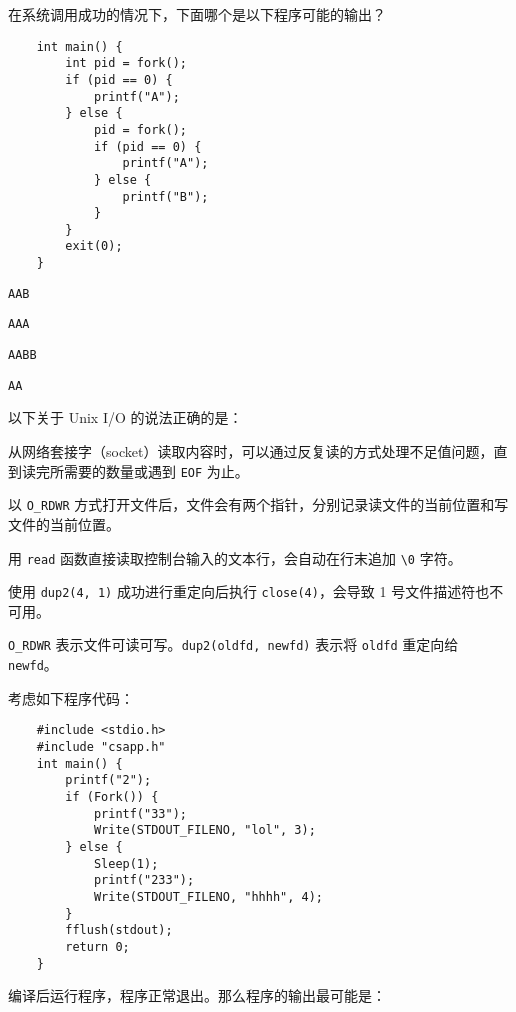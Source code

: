 \begin{problems}
\begin{choices}
        \end{choices}
         在系统调用成功的情况下，下面哪个是以下程序可能的输出？
        \begin{verbatim}
    int main() {
        int pid = fork();
        if (pid == 0) {
            printf("A");
        } else {
            pid = fork();
            if (pid == 0) {
                printf("A");
            } else {
                printf("B");
            }
        }
        exit(0);
    }
        \end{verbatim}
        \begin{choices}
            \item \verb|AAB|
            \item \verb|AAA|
            \item \verb|AABB|
            \item \verb|AA|
        \end{choices}
         以下关于 Unix I/O 的说法正确的是：
        \begin{choices}
            \item 从网络套接字（socket）读取内容时，可以通过反复读的方式处理不足值问题，直到读完所需要的数量或遇到 \verb|EOF| 为止。
            \item 以 \verb|O_RDWR| 方式打开文件后，文件会有两个指针，分别记录读文件的当前位置和写文件的当前位置。
            \item 用 \verb|read| 函数直接读取控制台输入的文本行，会自动在行末追加 \verb|\0| 字符。
            \item 使用 \verb|dup2(4, 1)| 成功进行重定向后执行 \verb|close(4)|，会导致 1 号文件描述符也不可用。
        \end{choices}
        \begin{hint}
            \verb|O_RDWR| 表示文件可读可写。\verb|dup2(oldfd, newfd)| 表示将 \verb|oldfd| 重定向给 \verb|newfd|。
        \end{hint}
         考虑如下程序代码：
        \begin{verbatim}
    #include <stdio.h>
    #include "csapp.h"
    int main() {
        printf("2");
        if (Fork()) {
            printf("33");
            Write(STDOUT_FILENO, "lol", 3);
        } else {
            Sleep(1);
            printf("233");
            Write(STDOUT_FILENO, "hhhh", 4);
        }
        fflush(stdout);
        return 0;
    }
        \end{verbatim}
        编译后运行程序，程序正常退出。那么程序的输出最可能是：

\end{problems}
